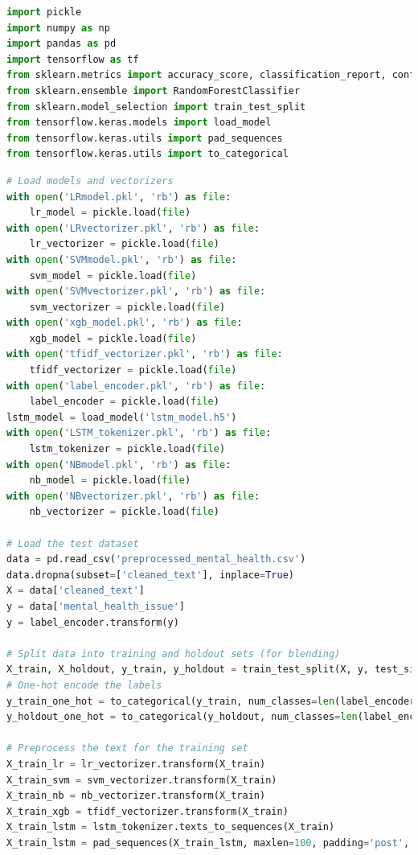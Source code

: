 \begin{tcolorbox}[colback=gray!5!white, colframe=gray!80!black, boxrule=0.5pt, title=Blending with Random Forest as Meta-Learner]
    \begin{lstlisting}[language=Python]
import pickle
import numpy as np
import pandas as pd
import tensorflow as tf
from sklearn.metrics import accuracy_score, classification_report, confusion_matrix
from sklearn.ensemble import RandomForestClassifier
from sklearn.model_selection import train_test_split
from tensorflow.keras.models import load_model
from tensorflow.keras.utils import pad_sequences
from tensorflow.keras.utils import to_categorical
\end{lstlisting}
\end{tcolorbox}
\begin{tcolorbox}[colback=gray!5!white, colframe=gray!80!black, boxrule=0.5pt, title=Blending with Random Forest as Meta-Learner]
    \begin{lstlisting}[language=Python]
# Load models and vectorizers
with open('LRmodel.pkl', 'rb') as file:
    lr_model = pickle.load(file)
with open('LRvectorizer.pkl', 'rb') as file:
    lr_vectorizer = pickle.load(file)
with open('SVMmodel.pkl', 'rb') as file:
    svm_model = pickle.load(file)
with open('SVMvectorizer.pkl', 'rb') as file:
    svm_vectorizer = pickle.load(file)
with open('xgb_model.pkl', 'rb') as file:
    xgb_model = pickle.load(file)
with open('tfidf_vectorizer.pkl', 'rb') as file:
    tfidf_vectorizer = pickle.load(file)
with open('label_encoder.pkl', 'rb') as file:
    label_encoder = pickle.load(file)
lstm_model = load_model('lstm_model.h5')
with open('LSTM_tokenizer.pkl', 'rb') as file:
    lstm_tokenizer = pickle.load(file)
with open('NBmodel.pkl', 'rb') as file:
    nb_model = pickle.load(file)
with open('NBvectorizer.pkl', 'rb') as file:
    nb_vectorizer = pickle.load(file)

# Load the test dataset
data = pd.read_csv('preprocessed_mental_health.csv')
data.dropna(subset=['cleaned_text'], inplace=True)
X = data['cleaned_text']
y = data['mental_health_issue']
y = label_encoder.transform(y)

# Split data into training and holdout sets (for blending)
X_train, X_holdout, y_train, y_holdout = train_test_split(X, y, test_size=0.2, random_state=42)
# One-hot encode the labels
y_train_one_hot = to_categorical(y_train, num_classes=len(label_encoder.classes_))
y_holdout_one_hot = to_categorical(y_holdout, num_classes=len(label_encoder.classes_))

# Preprocess the text for the training set
X_train_lr = lr_vectorizer.transform(X_train)
X_train_svm = svm_vectorizer.transform(X_train)
X_train_nb = nb_vectorizer.transform(X_train)
X_train_xgb = tfidf_vectorizer.transform(X_train)
X_train_lstm = lstm_tokenizer.texts_to_sequences(X_train)
X_train_lstm = pad_sequences(X_train_lstm, maxlen=100, padding='post', truncating='post')
\end{lstlisting}
\end{tcolorbox}

